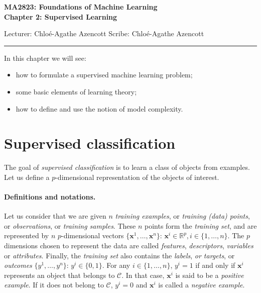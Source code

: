 \documentclass[a4paper,12pt]{article}
\newcommand{\cc}{\mathcal{C}}
\newcommand{\xx}{{\bm x}}
\begin{document}

\begin{center}
\bf\large MA2823: Foundations of Machine Learning \\
Chapter 2: Supervised Learning
\end{center}

\noindent
Lecturer: Chlo\'e-Agathe Azencott   
\hfill
Scribe: Chlo\'e-Agathe Azencott

\noindent
\rule{\textwidth}{1pt}

\medskip

In this chapter we will see:
\begin{itemize}
\item how to formulate a supervised machine learning problem;
\item some basic elements of learning theory;
\item how to define and use the notion of model complexity.
\end{itemize}

\section{Supervised classification}
The goal of {\em supervised classification} is to learn a class of objects from examples. Let us define a $p$-dimensional representation of the objects of interest. 

\paragraph{Definitions and notations.} Let us consider that we are given $n$ {\em training examples}, or {\em training (data) points}, or {\em observations}, or {\em training samples}. These $n$ points form the {\em training set}, and are represented by $n$ $p$-dimensional vectors $\{\xx^1, \dots, \xx^n\}$: $\xx^i \in \mathbb{R}^p, i \in \{1, \dots, n\}$. The $p$ dimensions chosen to represent the data are called {\em features}, {\em descriptors}, {\em variables} or {\em attributes}. Finally, the {\em training set} also contains the {\em labels}, {\em or targets}, or {\em outcomes} $\{y^1, \dots, y^n\}$: $y^i \in \{0, 1\}$. For any $i \in \{1, \dots, n\}$,  $y^i = 1$ if and only if $\xx^i$ represents an object that belongs to $\cc$. In that case, $\xx^i$ is said to be a {\em positive example}. If it does not belong to $\cc$, $y^i=0$ and $\xx^i$ is called a {\em negative example}. \\
\end{document}
